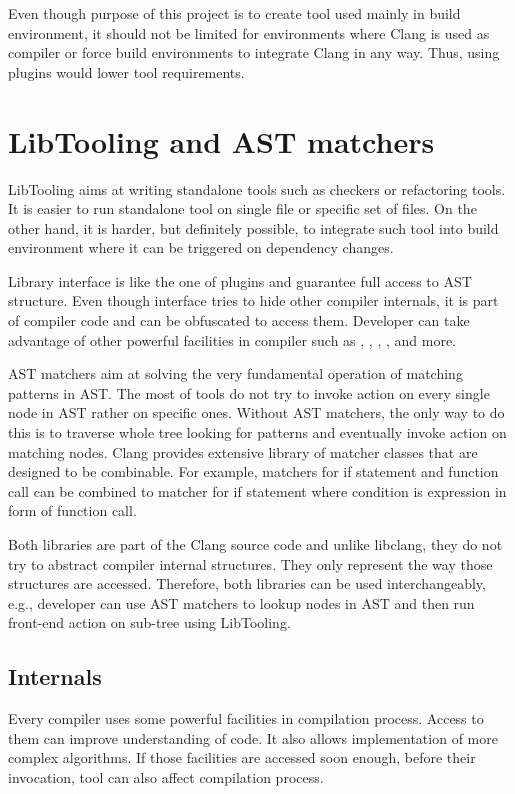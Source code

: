 Even though purpose of this project is to create tool used mainly in build environment, it should not be limited for environments where Clang is used as compiler or force build environments to integrate Clang in any way. Thus, using plugins would lower tool requirements.

\section{LibTooling and AST matchers}
LibTooling aims at writing standalone tools such as checkers or refactoring tools. It is easier to run standalone tool on single file or specific set of files. On the other hand, it is harder, but definitely possible, to integrate such tool into build environment where it can be triggered on dependency changes.

Library interface is like the one of plugins and guarantee full access to AST structure. Even though interface tries to hide other compiler internals, it is part of compiler code and can be obfuscated to access them. Developer can take advantage of other powerful facilities in compiler such as , , , ,  and more.

AST matchers aim at solving the very fundamental operation of matching patterns in AST. The most of tools do not try to invoke action on every single node in AST rather on specific ones. Without AST matchers, the only way to do this is to traverse whole tree looking for patterns and eventually invoke action on matching nodes. Clang provides extensive library of matcher classes that are designed to be combinable. For example, matchers for if statement and function call can be combined to matcher for if statement where condition is expression in form of function call.

Both libraries are part of the Clang source code and unlike libclang, they do not try to abstract compiler internal structures. They only represent the way those structures are accessed. Therefore, both libraries can be used interchangeably, e.g., developer can use AST matchers to lookup nodes in AST and then run front-end action on sub-tree using LibTooling.

\subsection{Internals}
Every compiler uses some powerful facilities in compilation process. Access to them can improve understanding of code. It also allows implementation of more complex algorithms. If those facilities are accessed soon enough, before their invocation, tool can also affect compilation process.

